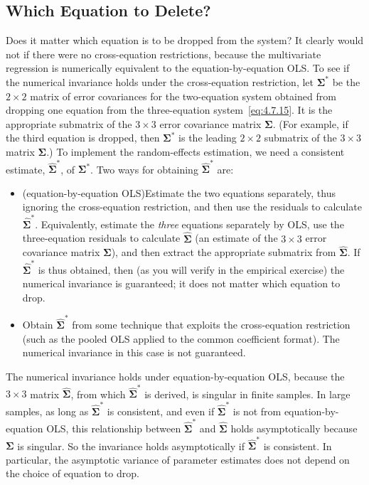 \subsection*{Which Equation to Delete?}

Does it matter which equation is to be dropped from the system? It clearly would
not if there were no cross-equation restrictions, because the multivariate regression
is numerically equivalent to the equation-by-equation OLS. To see if the numerical
invariance holds under the cross-equation restriction, let
$\boldsymbol{\Sigma}^*$ be the $2 \times 2$ matrix of error covariances for the
two-equation system obtained from dropping one equation from the three-equation
system~\eqref{eq:4.7.15}. It is the appropriate submatrix of the $3 \times 3$ error
covariance matrix $\boldsymbol{\Sigma}$. (For example, if the third equation is dropped,
then $\boldsymbol{\Sigma}^*$ is the leading $2 \times 2$ submatrix of the $3 \times 3$
matrix $\boldsymbol{\Sigma}$.) To implement the random-effects estimation, we need a
consistent estimate, $\widehat{\boldsymbol{\Sigma}}^*$, of $\boldsymbol{\Sigma}^*$.
Two ways for obtaining $\widehat{\boldsymbol{\Sigma}}^*$ are:

\begin{itemize}
\item (equation-by-equation OLS)\quad Estimate the two equations separately, thus
ignoring the cross-equation restriction, and then use the residuals to calculate
$\widehat{\boldsymbol{\Sigma}}^*$. Equivalently, estimate the \textit{three}
equations separately by OLS, use the three-equation residuals to calculate
$\widehat{\boldsymbol{\Sigma}}$ (an estimate of the $3 \times 3$ error covariance
matrix $\boldsymbol{\Sigma}$), and then extract the appropriate submatrix from
$\widehat{\boldsymbol{\Sigma}}$. If $\widehat{\boldsymbol{\Sigma}}^*$ is thus
obtained, then (as you will verify in the empirical exercise) the numerical invariance
is guaranteed; it does not matter which equation to drop.

\item Obtain $\widehat{\boldsymbol{\Sigma}}^*$ from some technique that exploits
the cross-equation restriction (such as the pooled OLS applied to the common
coefficient format). The numerical invariance in this case is not guaranteed.
\end{itemize}

The numerical invariance holds under equation-by-equation OLS, because the
$3 \times 3$ matrix $\widehat{\boldsymbol{\Sigma}}$, from which
$\widehat{\boldsymbol{\Sigma}}^*$ is derived, is singular in finite samples.
In large samples, as long as $\widehat{\boldsymbol{\Sigma}}^*$ is consistent,
and even if $\widehat{\boldsymbol{\Sigma}}^*$ is not from equation-by-equation OLS,
this relationship between $\widehat{\boldsymbol{\Sigma}}^*$ and
$\widehat{\boldsymbol{\Sigma}}$ holds asymptotically because $\boldsymbol{\Sigma}$
is singular. So the invariance holds asymptotically if
$\widehat{\boldsymbol{\Sigma}}^*$ is consistent. In particular, the asymptotic
variance of parameter estimates does not depend on the choice of equation to drop.


